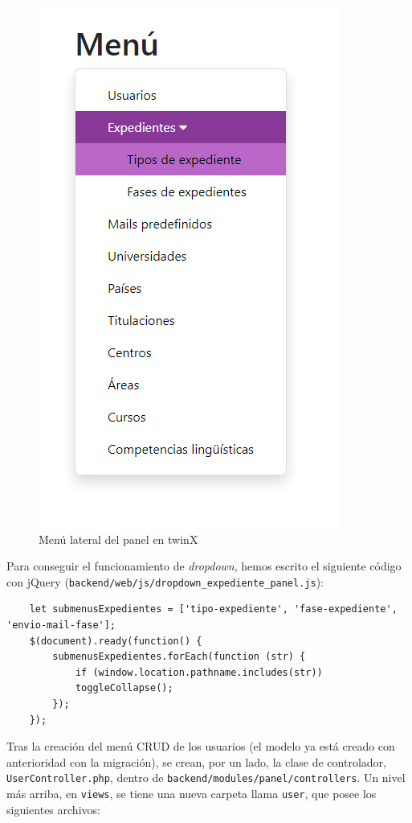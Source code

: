 \begin{figure}
	\centering
	\includegraphics[height=0.4\textheight]{img/Capturas de twinX/sidebar_panel}
	\caption{Menú lateral del panel en twinX}
	\label{fig:sidebarpaneltwinX}
\end{figure}

Para conseguir el funcionamiento de \textit{dropdown}, hemos escrito el siguiente código con jQuery (\texttt{backend/web/js/dropdown\_expediente\_panel.js}):

\begin{verbatim}
	let submenusExpedientes = ['tipo-expediente', 'fase-expediente', 'envio-mail-fase'];
	$(document).ready(function() {
		submenusExpedientes.forEach(function (str) {
			if (window.location.pathname.includes(str))
			toggleCollapse();
		});
	});
\end{verbatim}

Tras la creación del menú CRUD de los usuarios (el modelo ya está creado con anterioridad con la migración), se crean, por un lado, la clase de controlador, \texttt{UserController.php}, dentro de \texttt{backend/modules/panel/controllers}. Un nivel más arriba, en \texttt{views}, se tiene una nueva carpeta llama \texttt{user}, que posee los siguientes archivos:

